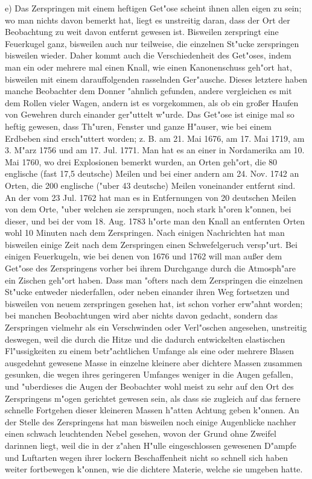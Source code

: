 \documentclass[a4paper, 11pt, oneside, polutonikogreek, german]{article}
\begin{document}
e) Das Zerspringen mit einem heftigen Get"ose scheint ihnen allen eigen zu sein; wo man nichts davon bemerkt hat, liegt es unstreitig daran, dass der Ort der Beobachtung zu weit davon entfernt gewesen ist. Bisweilen zerspringt eine Feuerkugel ganz, bisweilen auch nur teilweise, die einzelnen St"ucke zerspringen bisweilen wieder. Daher kommt auch die Verschiedenheit des Get"oses, indem man ein oder mehrere mal einen Knall, wie einen Kanonenschuss geh"ort hat, bisweilen mit einem darauffolgenden rasselnden Ger"ausche. Dieses letztere haben manche Beobachter dem Donner "ahnlich gefunden, andere vergleichen es mit dem Rollen vieler Wagen, andern ist es vorgekommen, als ob ein großer Haufen von Gewehren durch einander ger"uttelt w"urde. Das Get"ose ist einige mal so heftig gewesen, dass Th"uren, Fenster und ganze H"auser, wie bei einem Erdbeben sind ersch"uttert worden; z. B. am 21. Mai 1676, am 17. Mai 1719, am 3. M"arz 1756 und am 17. Jul. 1771. Man hat es an einer in Nordamerika am 10. Mai 1760, wo drei Explosionen bemerkt wurden, an Orten geh"ort, die 80 englische (fast 17,5 deutsche) Meilen und bei einer andern am 24. Nov. 1742 an Orten, die 200 englische ("uber 43 deutsche) Meilen voneinander entfernt sind. An der vom 23 Jul. 1762 hat man es in Entfernungen von 20 deutschen Meilen von dem Orte, "uber welchen sie zersprungen, noch stark h"oren k"onnen, bei dieser, und bei der vom 18. Aug. 1783 h"orte man den Knall an entfernten Orten wohl 10 Minuten nach dem Zerspringen. Nach einigen Nachrichten hat man bisweilen einige Zeit nach dem Zerspringen einen Schwefelgeruch versp"urt. Bei einigen Feuerkugeln, wie bei denen von 1676 und 1762 will man außer dem Get"ose des Zerspringens vorher bei ihrem Durchgange durch die Atmosph"are ein Zischen geh"ort haben. Dass man "ofters nach dem Zerspringen die einzelnen St"ucke entweder niederfallen, oder neben einander ihren Weg fortsetzen und bisweilen von neuem zerspringen gesehen hat, ist schon vorher erw"ahnt worden; bei manchen Beobachtungen wird aber nichts davon gedacht, sondern das Zerspringen vielmehr als ein Verschwinden oder Verl"oschen angesehen, unstreitig deswegen, weil die durch die Hitze und die dadurch entwickelten elastischen Fl"ussigkeiten zu einem betr"achtlichen Umfange als eine oder mehrere Blasen ausgedehnt gewesene Masse in einzelne kleinere aber dichtere Massen zusammen gesunken, die wegen ihres geringeren Umfanges weniger in die Augen gefallen, und "uberdieses die Augen der Beobachter wohl meist zu sehr auf den Ort des Zerspringens m"ogen gerichtet gewesen sein, als dass sie zugleich auf das fernere schnelle Fortgehen dieser kleineren Massen h"atten Achtung geben k"onnen. An der Stelle des Zerspringens hat man bisweilen noch einige Augenblicke nachher einen schwach leuchtenden Nebel gesehen, wovon der Grund ohne Zweifel darinnen liegt, weil die in der z"ahen H"ulle eingeschlossen gewesenen D"ampfe und Luftarten wegen ihrer lockern Beschaffenheit nicht so schnell sich haben weiter fortbewegen k"onnen, wie die dichtere Materie, welche sie umgeben hatte.
\end{document}
